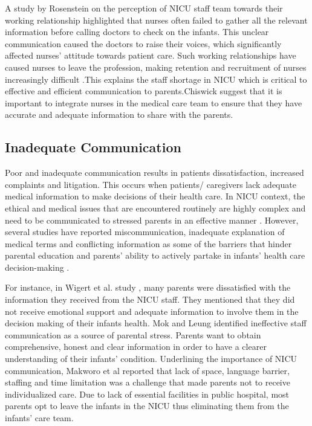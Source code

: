 A study by Rosenstein \citep{Rosenstein2002} on the perception of NICU staff team towards their working relationship highlighted that nurses often failed to gather all the relevant information before calling doctors to check on the infants. This unclear communication caused the doctors to raise their voices, which significantly affected nurses' attitude towards patient care. Such working relationships have caused nurses to leave the profession, making retention and recruitment of nurses increasingly difficult \citep{Chiswick1987} .This explains the staff shortage in NICU which is critical to effective and efficient communication to parents.Chiswick \citep{Chiswick1987} suggest that it is important to integrate nurses in the medical care team to ensure that they have accurate and adequate information to share with the parents.

\subsection{Inadequate Communication}
Poor and inadequate communication results in patients dissatisfaction, increased complaints and litigation. This occurs when patients/ caregivers lack adequate medical information to make decisions of their health care. In NICU context, the ethical and medical issues that are encountered routinely are highly complex and need to be communicated to stressed parents in an effective manner \citep{Enke2017}. However, several studies have reported miscommunication, inadequate explanation of medical terms and conflicting information as some of the barriers that hinder parental education and parents’ ability to actively partake in infants' health care decision-making \citep{Musabirema2015, Fleck2016, Spiridonov2017, Weis2015 }. 

For instance, in Wigert et al. study \citep{Wigert2013}, many parents were dissatisfied with the information they received from the NICU staff. They mentioned that they did not receive emotional support and adequate information to involve them in the decision making of their infants health. Mok and Leung \citep{Mok2006} identified ineffective staff communication as a source of parental stress.  Parents want to obtain comprehensive, honest and clear information in order to have a clearer understanding of their infants' condition. Underlining the importance of NICU communication, Makworo et al \citep{D2016} reported that lack of space, language barrier, staffing and time limitation was a challenge that made parents not to receive individualized care. Due to lack of essential facilities in public hospital, most parents opt to leave the infants in the NICU thus eliminating them from the infants' care team.

